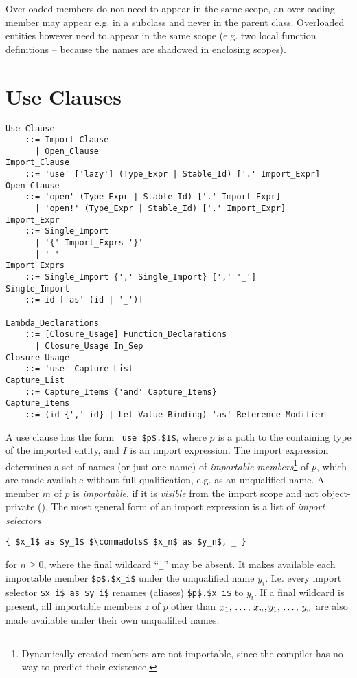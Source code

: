 Overloaded members do not need to appear in the same scope, an overloading member may appear e.g. in a subclass and never in the parent class. Overloaded entities however need to appear in the same scope (e.g. two local function definitions -- because the names are shadowed in enclosing scopes). 





\section{Use Clauses}
\label{sec:use-clauses}

\grammar\begin{lstlisting}
Use_Clause 
    ::= Import_Clause
      | Open_Clause
Import_Clause
    ::= 'use' ['lazy'] (Type_Expr | Stable_Id) ['.' Import_Expr]
Open_Clause
    ::= 'open' (Type_Expr | Stable_Id) ['.' Import_Expr]
      | 'open!' (Type_Expr | Stable_Id) ['.' Import_Expr]
Import_Expr
    ::= Single_Import
      | '{' Import_Exprs '}'
      | '_'
Import_Exprs
    ::= Single_Import {',' Single_Import} [',' '_']
Single_Import 
    ::= id ['as' (id | '_')]
    
Lambda_Declarations
    ::= [Closure_Usage] Function_Declarations
      | Closure_Usage In_Sep
Closure_Usage
    ::= 'use' Capture_List
Capture_List
    ::= Capture_Items {'and' Capture_Items}
Capture_Items
    ::= (id {',' id} | Let_Value_Binding) 'as' Reference_Modifier
\end{lstlisting}

A use clause has the form ~\lstinline!use $p$.$I$!, where $p$ is a path to the containing type of the imported entity, and $I$ is an import expression. The import expression determines a set of names (or just one name) of {\em importable members}\footnote{Dynamically created members are not importable, since the compiler has no way to predict their existence.} of $p$, which are made available without full qualification, e.g. as an unqualified name. A member $m$ of $p$ is {\em importable}, if it is {\em visible} from the import scope and not object-private (). The most general form of an import expression is a list of {\em import selectors}
\begin{lstlisting}
{ $x_1$ as $y_1$ $\commadots$ $x_n$ as $y_n$, _ }
\end{lstlisting}
for $n \ge 0$, where the final wildcard ``\lstinline!_!'' may be absent. It makes available each importable member \lstinline!$p$.$x_i$! under the unqualified name $y_i$. I.e. every import selector \lstinline!$x_i$ as $y_i$! renames (aliases) \lstinline!$p$.$x_i$! to $y_i$. If a final wildcard is present, all importable members $z$ of $p$ other than $x_1 ,\, \ldots ,\, x_n, y_1 ,\, \ldots ,\, y_n$ are also made available under their own unqualified names. 

